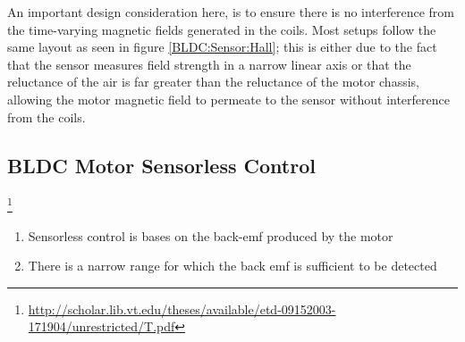 \documentclass[a4paper]{article}
\begin{document}
    An important design consideration here, is to ensure there is no
    interference from the time-varying magnetic fields generated in the coils.
    Most setups follow the same layout as seen in figure \ref{BLDC:Sensor:Hall};
    this is either due to the fact that the sensor measures field strength in a
    narrow linear axis or that the reluctance of the air is far greater than the
    reluctance of the motor chassis, allowing the motor magnetic field to
    permeate to the sensor without interference from the coils.

\subsection{BLDC Motor Sensorless Control}
\footnote{\url{http://scholar.lib.vt.edu/theses/available/etd-09152003-171904/unrestricted/T.pdf}}
	\begin{enumerate}
	\item Sensorless control is bases on the back-emf produced by the motor
	\item There is a narrow range for which the back emf is sufficient to be detected
	\end{enumerate}
\end{document}
